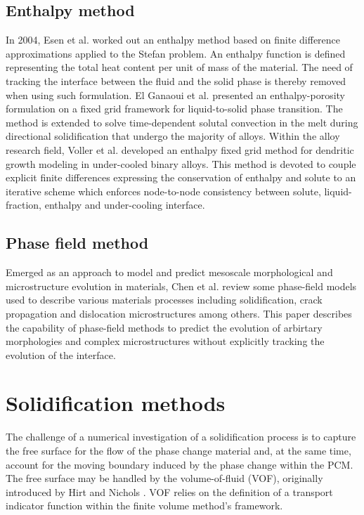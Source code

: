 \subsection{Enthalpy method}

\setlength{\parindent}{0.5cm} In 2004, Esen et al. \cite{esen_kutluay_2004} worked out an enthalpy method based on finite difference approximations applied to the Stefan problem. An enthalpy function is defined representing the total heat content per unit of mass of the material. The need of tracking the interface between the fluid and the solid phase is thereby removed when using such formulation. El Ganaoui et al. \cite{el_ganaoui_lamazouade_bontoux_morvan_2002} presented an enthalpy-porosity formulation on a fixed grid framework for liquid-to-solid phase transition. The method is extended to solve time-dependent solutal convection in the melt during directional solidification that undergo the majority of alloys. Within the alloy research field, Voller et al. \cite{voller_2008} developed an enthalpy fixed grid method for dendritic growth modeling in under-cooled binary alloys. This method is devoted to couple explicit finite differences expressing the conservation of enthalpy and solute to an iterative scheme which enforces node-to-node consistency between solute, liquid-fraction, enthalpy and under-cooling interface.

\subsection{Phase field method}

\setlength{\parindent}{0.5cm} Emerged as an approach to model and predict mesoscale morphological and microstructure evolution in materials, Chen et al. \cite{chen_2002} review some phase-field models used to describe various materials processes including solidification, crack propagation and dislocation microstructures among others. This paper describes the capability of phase-field methods to predict the evolution of arbirtary morphologies and complex microstructures without explicitly tracking the evolution of the interface.

\section{Solidification methods}

\setlength{\parindent}{0.5cm} The challenge of a numerical investigation of a solidification process is to capture the free surface for the flow of the phase change material and, at the same time, account for the moving boundary induced by the phase change within the PCM. The free surface may be handled by the volume-of-fluid (VOF), originally introduced by Hirt and Nichols  \cite{hirt_nichols_1981}. VOF relies on the definition of a transport indicator function within the finite volume method's framework.

